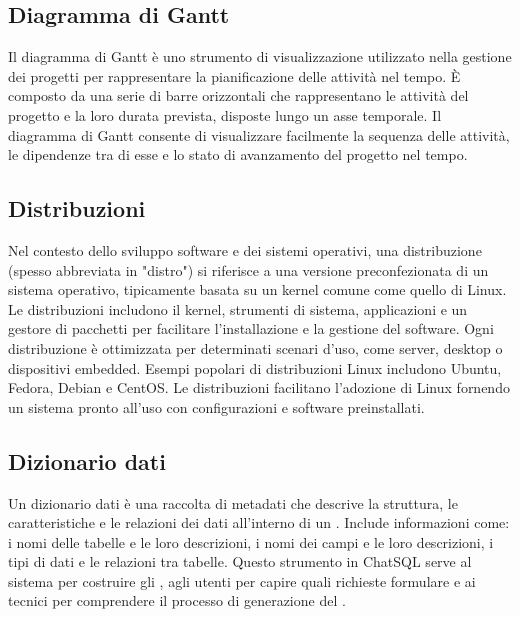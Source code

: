 \vspace{2em}
\subsection*{Diagramma di Gantt}
Il diagramma di Gantt è uno strumento di visualizzazione utilizzato nella gestione dei progetti per rappresentare la pianificazione delle attività nel tempo. È composto da una serie di barre orizzontali che rappresentano le attività del progetto e la loro durata prevista, disposte lungo un asse temporale. Il diagramma di Gantt consente di visualizzare facilmente la sequenza delle attività, le dipendenze tra di esse e lo stato di avanzamento del progetto nel tempo.

\vspace{2em}
\subsection*{Distribuzioni}
Nel contesto dello sviluppo software e dei sistemi operativi, una distribuzione (spesso abbreviata in "distro") si riferisce a una versione preconfezionata di un sistema operativo, tipicamente basata su un kernel comune come quello di Linux. Le distribuzioni includono il kernel, strumenti di sistema, applicazioni e un gestore di pacchetti per facilitare l'installazione e la gestione del software. Ogni distribuzione è ottimizzata per determinati scenari d'uso, come server, desktop o dispositivi embedded. Esempi popolari di distribuzioni Linux includono Ubuntu, Fedora, Debian e CentOS. Le distribuzioni facilitano l'adozione di Linux fornendo un sistema pronto all'uso con configurazioni e software preinstallati.

\vspace{2em}
\subsection*{Dizionario dati}
Un dizionario dati è una raccolta di metadati che descrive la struttura, le caratteristiche e le relazioni dei dati all'interno di un . Include informazioni come: i nomi delle tabelle e le loro descrizioni, i nomi dei campi e le loro descrizioni, i tipi di dati e le relazioni tra tabelle. Questo strumento in ChatSQL serve al sistema per costruire gli , agli utenti per capire quali richieste formulare e ai tecnici per comprendere il processo di generazione del .

\vspace{2em}
